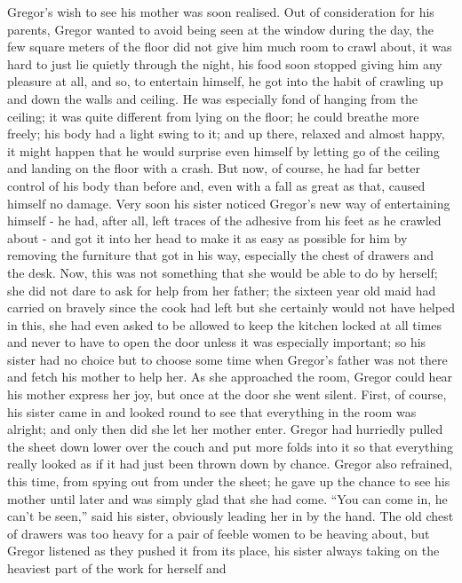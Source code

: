 \documentclass[12pt]{report}
\begin{document}
Gregor's wish to see his mother was soon realised. Out of consideration
for his parents, Gregor wanted to avoid being seen at the window during
the day, the few square meters of the floor did not give him much room
to crawl about, it was hard to just lie quietly through the night, his
food soon stopped giving him any pleasure at all, and so, to entertain
himself, he got into the habit of crawling up and down the walls and
ceiling. He was especially fond of hanging from the ceiling; it was
quite different from lying on the floor; he could breathe more freely;
his body had a light swing to it; and up there, relaxed and almost
happy, it might happen that he would surprise even himself by letting go
of the ceiling and landing on the floor with a crash. But now, of
course, he had far better control of his body than before and, even with
a fall as great as that, caused himself no damage. Very soon his sister
noticed Gregor's new way of entertaining himself - he had, after all,
left traces of the adhesive from his feet as he crawled about - and got
it into her head to make it as easy as possible for him by removing the
furniture that got in his way, especially the chest of drawers and the
desk. Now, this was not something that she would be able to do by
herself; she did not dare to ask for help from her father; the sixteen
year old maid had carried on bravely since the cook had left but she
certainly would not have helped in this, she had even asked to be
allowed to keep the kitchen locked at all times and never to have to
open the door unless it was especially important; so his sister had no
choice but to choose some time when Gregor's father was not there and
fetch his mother to help her. As she approached the room, Gregor could
hear his mother express her joy, but once at the door she went silent.
First, of course, his sister came in and looked round to see that
everything in the room was alright; and only then did she let her mother
enter. Gregor had hurriedly pulled the sheet down lower over the couch
and put more folds into it so that everything really looked as if it had
just been thrown down by chance. Gregor also refrained, this time, from
spying out from under the sheet; he gave up the chance to see his mother
until later and was simply glad that she had come. ``You can come in, he
can't be seen,'' said his sister, obviously leading her in by the hand.
The old chest of drawers was too heavy for a pair of feeble women to be
heaving about, but Gregor listened as they pushed it from its place, his
sister always taking on the heaviest part of the work for herself and
\end{document}

